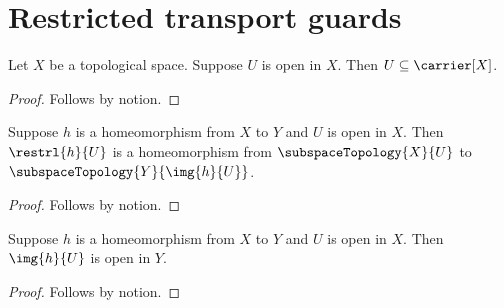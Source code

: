 \section{Restricted transport guards}



\begin{theorem}\label{transport_open_subset_guard}
    Let $X$ be a topological space.
    Suppose $U$ is open in $X$.
    Then $U\subseteq\carrier[X]$.
\end{theorem}
\begin{proof}
    Follows by notion.
\end{proof}

\begin{theorem}\label{transport_restricted_homeomorphism_guard}
    Suppose $h$ is a homeomorphism from $X$ to $Y$ and $U$ is open in $X$.
    Then $\restrl{h}{U}$ is a homeomorphism from $\subspaceTopology{X}{U}$
        to $\subspaceTopology{Y}{\img{h}{U}}$.
\end{theorem}
\begin{proof}
    Follows by notion.
\end{proof}

\begin{theorem}\label{transport_image_open_guard}
    Suppose $h$ is a homeomorphism from $X$ to $Y$ and $U$ is open in $X$.
    Then $\img{h}{U}$ is open in $Y$.
\end{theorem}
\begin{proof}
    Follows by notion.
\end{proof}
